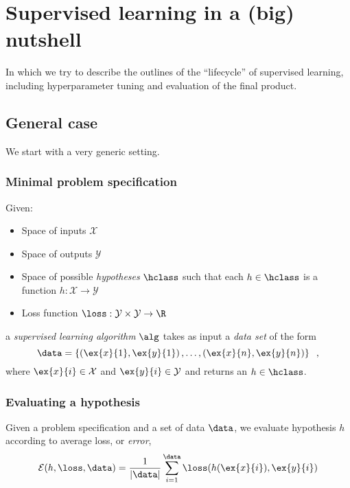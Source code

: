 
% 


% 
\chapter{Supervised learning in a (big) nutshell}
In which we try to describe the outlines of the ``lifecycle'' of
supervised learning, including hyperparameter tuning and evaluation of
the final product.

\section{General case}

We start with a very generic setting.

\subsection{Minimal problem specification}
Given:
\begin{itemize}
\item Space of inputs $\mathcal{X}$
\item Space of outputs $\mathcal{Y}$
\item Space of possible {\em hypotheses} $\hclass$ such that each
  $h \in \hclass$ is a function 
  $h: \mathcal{X} \rightarrow \mathcal{Y}$
\item Loss function $\loss : \mathcal{Y} \times \mathcal{Y}
  \rightarrow \R$
\end{itemize}
a {\em supervised learning algorithm} $\alg$
takes as input a {\em data set} of the form
\[\data = \left\{\left(\ex{x}{1}, \ex{y}{1}\right), \dots,
    \left(\ex{x}{n}, \ex{y}{n}\right)\right\}\;\;,\]
where $\ex{x}{i} \in \mathcal{X}$ and $\ex{y}{i} \in \mathcal{Y}$
and returns an $h \in \hclass$.

  \subsection{Evaluating a hypothesis}
  Given a problem specification and a set of data $\data$, we
  evaluate hypothesis $h$ according to average loss, or {\em error}, 
  \begin{eqnarray*}
  \mathcal{E}(h, \loss, \data) = \frac{1}{|\data|}\sum_{i = 1}^{\data}
\loss(h(\ex{x}{i}), \ex{y}{i})
  \end{eqnarray*}

